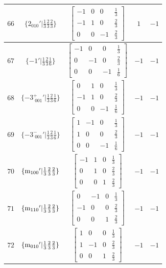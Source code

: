 \documentclass[fleqn,8pt]{jsarticle}
\begin{document}
\begin{longtable}{ccccc}
$ 66 $ & $ \{2{}_{010}{}'|\frac{1}{3} \frac{2}{3} \frac{2}{3}\} $ & $ \begin{bmatrix} -1 & 0 & 0 & \frac{1}{3} \\ -1 & 1 & 0 & \frac{2}{3} \\ 0 & 0 & -1 & \frac{2}{3} \end{bmatrix} $ & $ 1 $ & $ -1 $ \\ \hline
$ 67 $ & $ \{-1{}'|\frac{1}{3} \frac{2}{3} \frac{1}{6}\} $ & $ \begin{bmatrix} -1 & 0 & 0 & \frac{1}{3} \\ 0 & -1 & 0 & \frac{2}{3} \\ 0 & 0 & -1 & \frac{1}{6} \end{bmatrix} $ & $ -1 $ & $ -1 $ \\ \hline
$ 68 $ & $ \{-3^{+}_{\,\,001}{}'|\frac{1}{3} \frac{2}{3} \frac{1}{6}\} $ & $ \begin{bmatrix} 0 & 1 & 0 & \frac{1}{3} \\ -1 & 1 & 0 & \frac{2}{3} \\ 0 & 0 & -1 & \frac{1}{6} \end{bmatrix} $ & $ -1 $ & $ -1 $ \\ \hline
$ 69 $ & $ \{-3^{-}_{\,\,001}{}'|\frac{1}{3} \frac{2}{3} \frac{1}{6}\} $ & $ \begin{bmatrix} 1 & -1 & 0 & \frac{1}{3} \\ 1 & 0 & 0 & \frac{2}{3} \\ 0 & 0 & -1 & \frac{1}{6} \end{bmatrix} $ & $ -1 $ & $ -1 $ \\ \hline
$ 70 $ & $ \{{\rm m}_{100}{}'|\frac{1}{3} \frac{2}{3} \frac{2}{3}\} $ & $ \begin{bmatrix} -1 & 1 & 0 & \frac{1}{3} \\ 0 & 1 & 0 & \frac{2}{3} \\ 0 & 0 & 1 & \frac{2}{3} \end{bmatrix} $ & $ -1 $ & $ -1 $ \\ \hline
$ 71 $ & $ \{{\rm m}_{110}{}'|\frac{1}{3} \frac{2}{3} \frac{2}{3}\} $ & $ \begin{bmatrix} 0 & -1 & 0 & \frac{1}{3} \\ -1 & 0 & 0 & \frac{2}{3} \\ 0 & 0 & 1 & \frac{2}{3} \end{bmatrix} $ & $ -1 $ & $ -1 $ \\ \hline
$ 72 $ & $ \{{\rm m}_{010}{}'|\frac{1}{3} \frac{2}{3} \frac{2}{3}\} $ & $ \begin{bmatrix} 1 & 0 & 0 & \frac{1}{3} \\ 1 & -1 & 0 & \frac{2}{3} \\ 0 & 0 & 1 & \frac{2}{3} \end{bmatrix} $ & $ -1 $ & $ -1 $ \\
\end{longtable}
\end{document}
